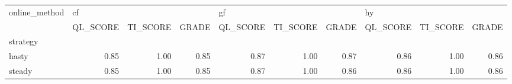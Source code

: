 \begin{tabular}{lrrrrrrrrr}
\toprule
online\_method & \multicolumn{3}{l}{cf} & \multicolumn{3}{l}{gf} & \multicolumn{3}{l}{hy} \\
{} & QL\_SCORE & TI\_SCORE & GRADE & QL\_SCORE & TI\_SCORE & GRADE & QL\_SCORE & TI\_SCORE & GRADE \\
strategy &          &          &       &          &          &       &          &          &       \\
\midrule
hasty    &     0.85 &     1.00 &  0.85 &     0.87 &     1.00 &  0.87 &     0.86 &     1.00 &  0.86 \\
steady   &     0.85 &     1.00 &  0.85 &     0.87 &     1.00 &  0.86 &     0.86 &     1.00 &  0.86 \\
\bottomrule
\end{tabular}
